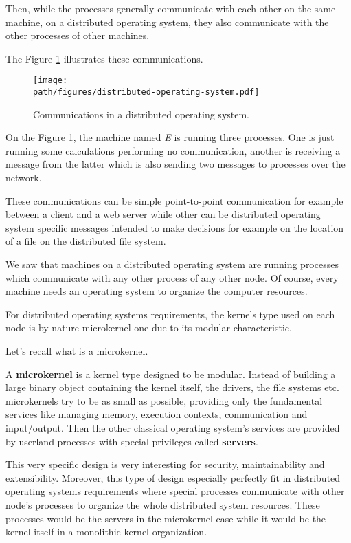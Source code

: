 Then, while the processes generally communicate with each other on the same
machine, on a distributed operating system, they also communicate with the
other processes of other machines.

The Figure \ref{figure:overview_distributed-operating-system} illustrates
these communications.

\begin{figure}[h]
  \begin{center}
    \texttt{[image: \\path/figures/distributed-operating-system.pdf]}
    \caption{Communications in a distributed operating system.}
    \label{figure:overview_distributed-operating-system}
  \end{center}
\end{figure}

On the Figure \ref{figure:overview_distributed-operating-system}, the machine
named \textit{E} is running three processes. One is just running some
calculations performing no communication, another is receiving a message
from the latter which is also sending two messages to processes over the
network.

These communications can be simple point-to-point communication for example
between a client and a web server while other can be distributed operating
system specific messages intended to make decisions for example on the
location of a file on the distributed file system.

We saw that machines on a distributed operating system are running processes
which communicate with any other process of any other node. Of course,
every machine needs an operating system to organize the computer resources.

For distributed operating systems requirements, the kernels type used on
each node is by nature microkernel one due to its modular characteristic.

Let's recall what is a microkernel.

A \textbf{microkernel} is a kernel type designed to be modular. Instead
of building a large binary object containing the kernel itself, the drivers,
the file systems etc. microkernels try to be as small as possible,
providing only the fundamental services like managing memory, execution
contexts, communication and input/output. Then the other classical operating
system's services are provided by userland processes with special privileges
called \textbf{servers}.

This very specific design is very interesting for security, maintainability
and extensibility. Moreover, this type of design especially perfectly fit
in distributed operating systems requirements where special processes
communicate with other node's processes to organize the whole distributed
system resources. These processes would be the servers in the microkernel
case while it would be the kernel itself in a monolithic kernel organization.

